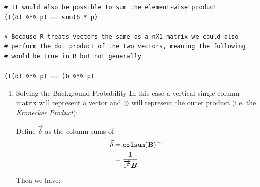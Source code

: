 \documentclass[11pt]{article}
\begin{document}
\begin{enumerate}
\begin{lstlisting}
# It would also be possible to sum the element-wise product
(t(δ) %*% p) == sum(δ * p)

# Because R treats vectors the same as a nX1 matrix we could also
# perform the dot product of the two vectors, meaning the following
# would be true in R but not generally

(t(δ) %*% p) == (δ %*% p)
\end{lstlisting}


\begin{enumerate}
\item Solving the Background Probability
\label{sec:orgc6a9b38}
In this case a vertical single column matrix will represent a vector and \(\otimes\) will represent the outer product (i.e. the \emph{Kronecker Product}):



Define \(\vec{\delta}\) as the column sums of
\[\begin{aligned}
     \vec{\delta} & = \mathtt{colsum} (\text{{\bfseries{B}}})^{- 1}\\
     & = \frac{1}{\overrightarrow{1^{{\scriptsize \ensuremath{\boldsymbol{T}}}}}
     \ensuremath{\boldsymbol{B}}}
   \end{aligned}\]


Then we have:



\end{enumerate}
\end{enumerate}
\end{document}
